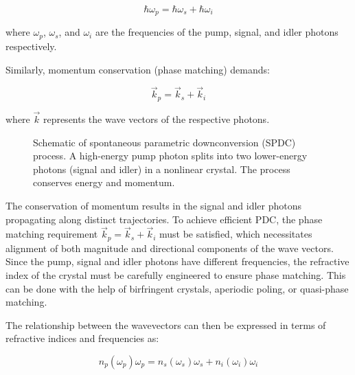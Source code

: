 \documentclass[
  a4paper,
]{book}
\begin{document}
\[
\hbar\omega_p = \hbar\omega_s + \hbar\omega_i
\]

where \(\omega_p\), \(\omega_s\), and \(\omega_i\) are the frequencies
of the pump, signal, and idler photons respectively.

Similarly, momentum conservation (phase matching) demands:

\[
\vec{k}_p = \vec{k}_s + \vec{k}_i
\]

where \(\vec{k}\) represents the wave vectors of the respective photons.

\begin{figure}


\caption{\label{fig-pdc}Schematic of spontaneous parametric
downconversion (SPDC) process. A high-energy pump photon splits into two
lower-energy photons (signal and idler) in a nonlinear crystal. The
process conserves energy and momentum.}

\end{figure}%

The conservation of momentum results in the signal and idler photons
propagating along distinct trajectories. To achieve efficient PDC, the
phase matching requirement \(\vec{k}_p = \vec{k}_s + \vec{k}_i\) must be
satisfied, which necessitates alignment of both magnitude and
directional components of the wave vectors. Since the pump, signal and
idler photons have different frequencies, the refractive index of the
crystal must be carefully engineered to ensure phase matching. This can
be done with the help of birfringent crystals, aperiodic poling, or
quasi-phase matching.

The relationship between the wavevectors can then be expressed in terms
of refractive indices and frequencies as:

\[
n_p(\omega_p)\omega_p = n_s(\omega_s)\omega_s + n_i(\omega_i)\omega_i
\]
\end{document}
